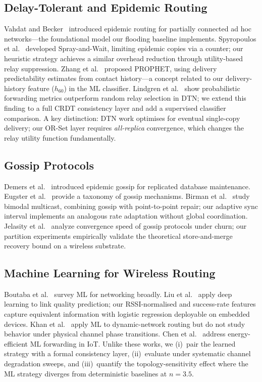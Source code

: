 \documentclass[conference]{IEEEtran}
\begin{document}
\subsection{Delay-Tolerant and Epidemic Routing}
Vahdat and Becker~\cite{vahdat2000epidemic} introduced epidemic routing for
partially connected ad hoc networks---the foundational model our flooding
baseline implements.  Spyropoulos et al.~\cite{spyropoulos_spray_2005}
developed Spray-and-Wait, limiting epidemic copies via a counter; our heuristic
strategy achieves a similar overhead reduction through utility-based relay
suppression.  Zhang et al.~\cite{zhang_prophet_2003} proposed PROPHET, using
delivery predictability estimates from contact history---a concept related to
our delivery-history feature ($h_{60}$) in the ML classifier.
Lindgren et al.~\cite{lindgren_probabilistic_2004} show probabilistic forwarding
metrics outperform random relay selection in DTN; we extend this finding to a
full CRDT consistency layer and add a supervised classifier comparison.
A key distinction: DTN work optimises for eventual single-copy delivery; our
OR-Set layer requires \emph{all-replica} convergence, which changes the relay
utility function fundamentally.

\subsection{Gossip Protocols}
Demers et al.~\cite{demers_gossip_1987} introduced epidemic gossip for
replicated database maintenance.  Eugster et al.~\cite{eugster_epidemic_2004}
provide a taxonomy of gossip mechanisms.  Birman et al.~\cite{birman_bimodal_1999}
study bimodal multicast, combining gossip with point-to-point repair; our
adaptive sync interval implements an analogous rate adaptation without global
coordination.  Jelasity et al.~\cite{jelasity_gossip_2005} analyze convergence
speed of gossip protocols under churn; our partition experiments empirically
validate the theoretical store-and-merge recovery bound on a wireless substrate.

\subsection{Machine Learning for Wireless Routing}
Boutaba et al.~\cite{boutaba_ml_survey_2018} survey ML for networking broadly.
Liu et al.~\cite{liu_link_2021} apply deep learning to link quality prediction;
our RSSI-normalised and success-rate features capture equivalent information
with logistic regression deployable on embedded devices.
Khan et al.~\cite{khan_ml_routing_2022} apply ML to dynamic-network routing
but do not study behavior under physical channel phase transitions.
Chen et al.~\cite{chen_energy_ml_2023} address energy-efficient ML forwarding
in IoT.  Unlike these works, we (i)~pair the learned strategy with a formal
consistency layer, (ii)~evaluate under systematic channel degradation sweeps,
and (iii)~quantify the topology-sensitivity effect where the ML strategy
diverges from deterministic baselines at $n=3.5$.
\end{document}
